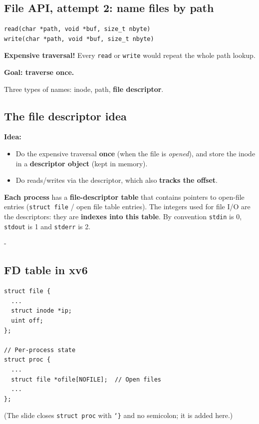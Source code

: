 \documentclass[11pt,a4paper]{article}
\makeatletter
\newcommand{\keepspace}[1]{\par\penalty-100\begingroup
  \setlength{\dimen@}{#1}\dimen@ii\pagegoal\advance\dimen@ii-\pagetotal
  \ifdim\dimen@>\dimen@ii\ifdim\dimen@ii>\z@\vfil\fi\break\fi\endgroup}
\makeatother
\begin{document}
\subsection{File API, attempt 2: name files by path}

\begin{lstlisting}[numbers=none]
read(char *path, void *buf, size_t nbyte)
write(char *path, void *buf, size_t nbyte)
\end{lstlisting}

\begin{quizbox}[Disadvantages?]
\textbf{Expensive traversal!} Every \texttt{read} or \texttt{write} would
repeat the whole path lookup.

\textbf{Goal: traverse once.}
\end{quizbox}

Three types of names: inode, path, \textbf{file descriptor}.

\subsection{The file descriptor idea}

\begin{defbox}
\textbf{Idea:}
\begin{itemize}
  \item Do the expensive traversal \textbf{once} (when the file is
        \emph{opened}), and store the inode in a \textbf{descriptor object}
        (kept in memory).
  \item Do reads/writes via the descriptor, which also \textbf{tracks the
        offset}.
\end{itemize}
\textbf{Each process} has a \textbf{file-descriptor table} that contains
pointers to open-file entries (\texttt{struct file} / open file table
entries). The integers used for file I/O are the descriptors: they are
\textbf{indexes into this table}. By convention
\texttt{stdin} is 0, \texttt{stdout} is 1 and \texttt{stderr} is 2.
\end{defbox}

\keepspace{7\baselineskip}
\subsection{FD table in xv6}


\begin{lstlisting}
struct file {
  ...
  struct inode *ip;
  uint off;
};

// Per-process state
struct proc {
  ...
  struct file *ofile[NOFILE];  // Open files
  ...
};
\end{lstlisting}
{\small (The slide closes \texttt{struct proc} with \texttt{\char`\}} and no
semicolon; it is added here.)}
\end{document}
